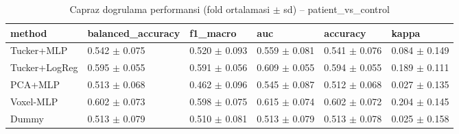 \begin{table}[htbp]
  \centering
  \caption{Capraz dogrulama performansi (fold ortalamasi $\pm$ sd) -- patient\_vs\_control}
  \label{tab:main_patient_vs_control}
  \small
  \begin{tabular}{llllll}
    \toprule
    method & balanced\_accuracy & f1\_macro & auc & accuracy & kappa \\
    \midrule
    Tucker+MLP & 0.542 $\pm$ 0.075 & 0.520 $\pm$ 0.093 & 0.559 $\pm$ 0.081 & 0.541 $\pm$ 0.076 & 0.084 $\pm$ 0.149 \\
    Tucker+LogReg & 0.595 $\pm$ 0.055 & 0.591 $\pm$ 0.056 & 0.609 $\pm$ 0.055 & 0.594 $\pm$ 0.055 & 0.189 $\pm$ 0.111 \\
    PCA+MLP & 0.513 $\pm$ 0.068 & 0.462 $\pm$ 0.096 & 0.545 $\pm$ 0.087 & 0.512 $\pm$ 0.068 & 0.027 $\pm$ 0.135 \\
    Voxel-MLP & 0.602 $\pm$ 0.073 & 0.598 $\pm$ 0.075 & 0.615 $\pm$ 0.074 & 0.602 $\pm$ 0.072 & 0.204 $\pm$ 0.145 \\
    Dummy & 0.513 $\pm$ 0.079 & 0.510 $\pm$ 0.081 & 0.513 $\pm$ 0.079 & 0.513 $\pm$ 0.078 & 0.025 $\pm$ 0.158 \\
    \bottomrule
  \end{tabular}
\end{table}
